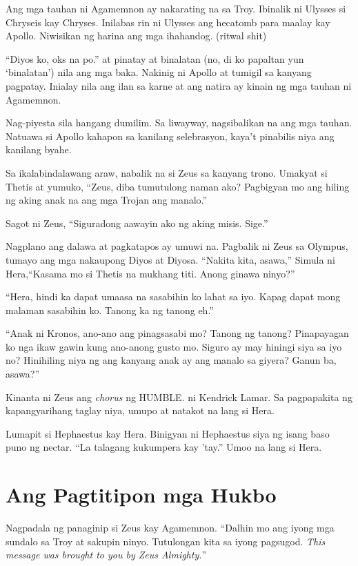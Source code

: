 \documentclass[12pt,letterpaper]{report}
\begin{document}
Ang mga tauhan ni Agamemnon ay nakarating na sa Troy. Ibinalik ni Ulysses si Chryseis kay Chryses. Inilabas rin ni Ulysses ang hecatomb para maalay kay Apollo. Niwisikan ng harina ang mga ihahandog. (ritwal shit)

``Diyos ko, oks na po.'' at pinatay at binalatan (no, di ko papaltan yun `binalatan') nila ang mga baka. Nakinig ni Apollo at tumigil sa kanyang pagpatay. Inialay nila ang ilan sa karne at ang natira ay kinain ng mga tauhan ni Agamemnon. 

Nag-piyesta sila hangang dumilim. Sa liwayway, nagsibalikan na ang mga tauhan. Natuawa si Apollo kahapon sa kanilang selebrasyon, kaya't pinabilis niya ang kanilang byahe.

Sa ikalabindalawang araw, nabalik na si Zeus sa kanyang trono. Umakyat si Thetis at yumuko, ``Zeus, diba tumutulong naman ako? Pagbigyan mo ang hiling ng aking anak na ang mga Trojan ang manalo.''

Sagot ni Zeus, ``Siguradong aawayin ako ng aking misis. Sige.''

Nagplano ang dalawa at pagkatapos ay umuwi na. Pagbalik ni Zeus sa Olympus, tumayo ang mga nakaupong Diyos at Diyosa. ``Nakita kita, asawa,'' Simula ni Hera,``Kasama mo si Thetis na mukhang titi. Anong ginawa ninyo?''

``Hera, hindi ka dapat umaasa na sasabihin ko lahat sa iyo. Kapag dapat mong malaman sasabihin ko. Tanong ka ng tanong eh.''

``Anak ni Kronos, ano-ano ang pinagsasabi mo? Tanong ng tanong? Pinapayagan ko nga ikaw gawin kung ano-anong gusto mo. Siguro ay may hiningi siya sa iyo no? Hinihiling niya ng ang kanyang anak ay ang manalo sa giyera? Ganun ba, asawa?''

Kinanta ni Zeus ang \textit{chorus} ng HUMBLE. ni Kendrick Lamar. Sa pagpapakita ng kapangyarihang taglay niya, umupo at natakot na lang si Hera.

Lumapit si Hephaestus kay Hera. Binigyan ni Hephaestus siya ng isang baso puno ng nectar. ``La talagang kukumpera kay 'tay.'' Umoo na lang si Hera.

\pagebreak
\chapter{Ang Pagtitipon mga Hukbo}

Nagpadala ng panaginip si Zeus kay Agamemnon. ``Dalhin mo ang iyong mga sundalo sa Troy at sakupin ninyo. Tutulongan kita sa iyong pagsugod. \textit{This message was brought to you by Zeus Almighty.}''
\end{document}
